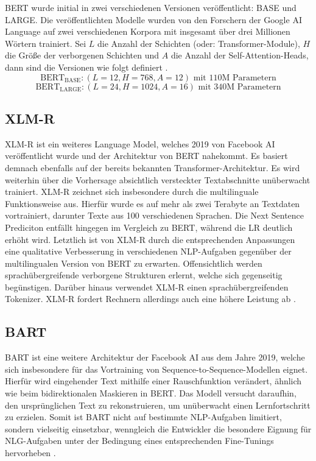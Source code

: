 \noindent
\ac{BERT} wurde initial in zwei verschiedenen Versionen veröffentlicht: BASE und LARGE. Die veröffentlichten Modelle wurden von den Forschern der Google AI Language auf zwei verschiedenen Korpora mit insgesamt über drei Millionen Wörtern trainiert. Sei $L$ die Anzahl der Schichten (oder: Transformer-Module), $H$ die Größe der verborgenen Schichten und $A$ die Anzahl der Self-Attention-Heads, dann sind die Versionen wie folgt definiert \cite[S.~3-5]{DEV19}. $$\text{BERT}_{\text{BASE}}: (L=12, H=768, A=12) \text{ mit } 110 \text{M Parametern}$$ $$\text{BERT}_{\text{LARGE}}: (L=24, H=1024, A=16) \text{ mit } 340 \text{M Parametern}$$


\subsection{XLM-R}
\noindent
\ac{XLM-R} ist ein weiteres Language Model, welches 2019 von Facebook AI veröffentlicht wurde und der Architektur von \ac{BERT} nahekommt. Es basiert demnach ebenfalls auf der bereits bekannten Transformer-Architektur. Es wird weiterhin über die Vorhersage absichtlich versteckter Textabschnitte unüberwacht trainiert. \ac{XLM-R} zeichnet sich insbesondere durch die multilinguale Funktionsweise aus. Hierfür wurde es auf mehr als zwei Terabyte an Textdaten vortrainiert, darunter Texte aus 100 verschiedenen Sprachen. Die Next Sentence Prediciton entfällt hingegen im Vergleich zu \ac{BERT}, während die \ac{LR} deutlich erhöht wird. Letztlich ist von \ac{XLM-R} durch die entsprechenden Anpassungen eine qualitative Verbesserung in verschiedenen \ac{NLP}-Aufgaben gegenüber der multilingualen Version von \ac{BERT} zu erwarten. Offensichtlich werden sprachübergreifende verborgene Strukturen erlernt, welche sich gegenseitig begünstigen. Darüber hinaus verwendet \ac{XLM-R} einen sprachübergreifenden Tokenizer. \ac{XLM-R} fordert Rechnern allerdings auch eine höhere Leistung ab \cite{CON20}.


\subsection{BART}
\noindent
\ac{BART} ist eine weitere Architektur der Facebook AI aus dem Jahre 2019, welche sich insbesondere für das Vortraining von Sequence-to-Sequence-Modellen eignet. Hierfür wird eingehender Text mithilfe einer Rauschfunktion verändert, ähnlich wie beim bidirektionalen Maskieren in \ac{BERT}. Das Modell versucht daraufhin, den ursprünglichen Text zu rekonstruieren, um unüberwacht einen Lernfortschritt zu erzielen. Somit ist \ac{BART} nicht auf bestimmte \ac{NLP}-Aufgaben limitiert, sondern vielseitig einsetzbar, wenngleich die Entwickler die besondere Eignung für \ac{NLG}-Aufgaben unter der Bedingung eines entsprechenden Fine-Tunings hervorheben \cite[S.~1]{LEW19}.\\

